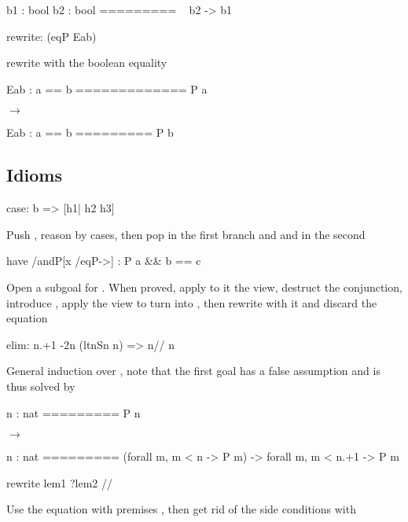 \begin{landscape}
\begin{small}
\begin{multicols*}{3}[\begin{center}\section*{}\end{center}]
\noindent\hspace{0.24\textwidth}
\begin{cheatout}
 b1 : bool
 b2 : bool
=========
 ~ b2 -> b1
\end{cheatout}


\begin{cheat}
rewrite: (eqP Eab)
\end{cheat}
rewrite with the boolean equality 


\begin{cheatout}
 Eab : a == b
=============
 P a
\end{cheatout}
$\to$
\begin{cheatout}
 Eab : a == b
=========
 P b
\end{cheatout}


\subsection*{Idioms}

\begin{cheat}
case: b => [h1| h2 h3]
\end{cheat}
  Push , reason by cases, then pop
   in the first branch and  and  in the second

\begin{cheat}
have /andP[x /eqP->] : P a && b == c
\end{cheat}
  Open a subgoal for . When proved,
  apply to it the  view, destruct the conjunction,
  introduce , apply the view  to turn
   into , then rewrite with it and discard the
  equation

\begin{cheat}
elim: n.+1 {-2}n (ltnSn n) => {n}// n
\end{cheat}
  General induction over , note that the first goal
  has a false assumption  and is
  thus solved by \C{//}

\begin{cheatout}
 n : nat
=========
 P n
\end{cheatout}
$\to$
\begin{cheatout}
 n : nat
=========
(forall m, m < n -> P m) ->
  forall m, m < n.+1 -> P m
\end{cheatout}


\begin{cheat}
rewrite lem1 ?lem2 //
\end{cheat}
  Use the equation with premises , then
  get rid of the side conditions with 


\end{multicols*}
\end{small}
\end{landscape}
